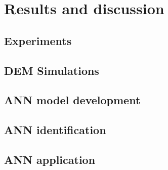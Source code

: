 
\section{Results and discussion}
\label{sec:results}

\subsection{Experiments}
\label{subsec:experiments}



% 
% 

\subsection{DEM Simulations}
\label{subsec:simulations}
% 




\subsection{ANN model development}
\label{subsec:annmodeldev}
% 

\subsection{ANN identification}
\label{subsec:annmodeliden}
% 

\subsection{ANN application}
\label{subsec:annapplication}



% 
% 
% 
% 
% 

